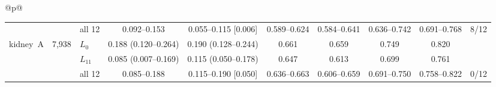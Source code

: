 \begin{longtable}{@{}p{\textwidth}@{}}
{\begin{tabular*}{\textwidth}{@{\extracolsep{\fill}}lrlccccccr@{}}
 &  & all 12 & 0.092--0.153 & 0.055--0.115 [0.006] & 0.589--0.624 & 0.584--0.641 & 0.636--0.742 & 0.691--0.768 & 8/12 \\
\addlinespace[2pt]
kidney~A & 7,938 & $L_{0}$ & 0.188 (0.120--0.264) & 0.190 (0.128--0.244) & 0.661 & 0.659 & 0.749 & 0.820 &  \\
 &  & $L_{11}$ & 0.085 (0.007--0.169) & 0.115 (0.050--0.178) & 0.647 & 0.613 & 0.699 & 0.761 &  \\
 &  & all 12 & 0.085--0.188 & 0.115--0.190 [0.050] & 0.636--0.663 & 0.606--0.659 & 0.691--0.750 & 0.758--0.822 & 0/12 \\
\end{tabular*}}\\
\end{longtable}
\endgroup
